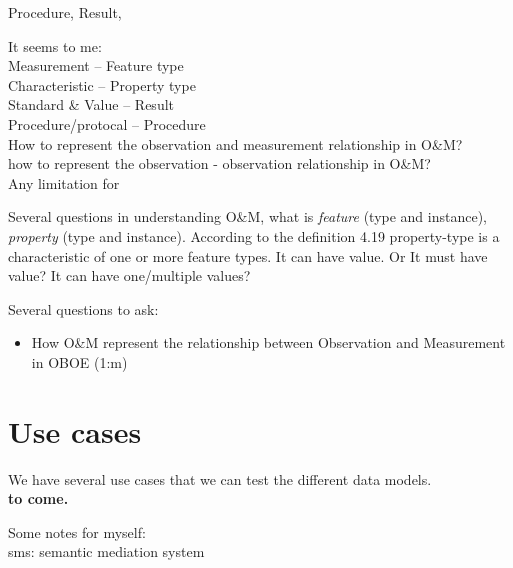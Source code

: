 \documentclass{article}
\begin{document}
Procedure, Result, 

It seems to me: \\
Measurement  -- Feature type\\
Characteristic -- Property type\\
Standard \& Value -- Result\\
Procedure/protocal -- Procedure\\

How to represent the observation and measurement relationship in O\&M? \\
how to represent the observation - observation relationship in O\&M?\\
Any limitation for 

Several questions in understanding O\&M, 
what is {\em feature} (type and instance), {\em property} (type and instance).
According to the definition  4.19 
property-type is a characteristic of one or more feature types. 
It can have value. Or It must have value? 
It can have one/multiple values?  

Several questions to ask:
\begin{itemize}
\item How O\&M represent the relationship between Observation and Measurement in OBOE (1:m)
\end{itemize}

 
\section{Use cases}
We have several use cases that we can test the different data models. \\
{\bf to come. }

Some notes for myself: \\
sms: semantic mediation system



\end{document}
